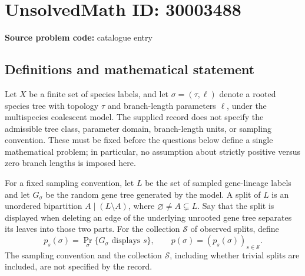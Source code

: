 \documentclass[11pt]{article}
\begin{document}
\section*{UnsolvedMath ID: 30003488}
\textbf{Source problem code:} catalogue entry
\subsection{Definitions and mathematical statement}
Let \(X\) be a finite set of species labels, and let \(\sigma=(\tau,\ell)\) denote a rooted species tree with topology \(\tau\) and branch-length parameters \(\ell\), under the multispecies coalescent model. The supplied record does not specify the admissible tree class, parameter domain, branch-length units, or sampling convention. These must be fixed before the questions below define a single mathematical problem; in particular, no assumption about strictly positive versus zero branch lengths is imposed here.

For a fixed sampling convention, let \(L\) be the set of sampled gene-lineage labels and let \(G_\sigma\) be the random gene tree generated by the model. A split of \(L\) is an unordered bipartition \(A\mid(L\setminus A)\), where \(\varnothing\ne A\subsetneq L\). Say that the split is displayed when deleting an edge of the underlying unrooted gene tree separates its leaves into those two parts. For the collection \(\mathcal S\) of observed splits, define
\[
 p_s(\sigma)=\Pr_\sigma\{G_\sigma\text{ displays }s\},\qquad
 p(\sigma)=(p_s(\sigma))_{s\in\mathcal S}.
\]
The sampling convention and the collection \(\mathcal S\), including whether trivial splits are included, are not specified by the record.
\end{document}
